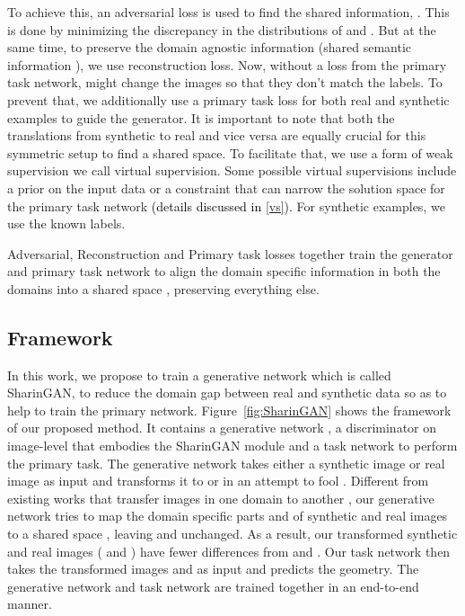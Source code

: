 \documentclass[10pt,twocolumn,letterpaper]{article}
\newcommand{\camready}[1]{\textcolor{black}{#1}}
\begin{document}
To achieve this, an adversarial loss is used to find the shared information, . This is done by minimizing the discrepancy in the distributions of  and . 
But at the same time, to preserve the domain agnostic information (shared semantic information ), we use reconstruction loss. 
Now, without a loss from the primary task network,  might change the images so that they don't match the labels. 
To prevent that, we additionally use a primary task loss for both real and synthetic examples to guide the generator. 
It is important to note that both the translations from synthetic to real and vice versa are equally crucial for this symmetric setup to find a shared space. 
To facilitate that, we use a form of weak supervision we call virtual supervision. Some possible virtual supervisions include a prior on the input data or a constraint that can narrow the solution space for the primary task network \camready{(details discussed in \ref{vs}).}
For synthetic examples, we use the known labels.

Adversarial, Reconstruction and Primary task losses together train the generator and primary task network to align the domain specific information  in both the domains into a shared space , preserving everything else.











\subsection{Framework}
In this work, we propose to train a generative network which is called SharinGAN, to reduce the domain gap between real and synthetic data so as to help to train the primary network.
Figure~\ref{fig:SharinGAN} shows the framework of our proposed method.
It contains a generative network , a discriminator on image-level  that embodies the SharinGAN module and a task network  to perform the primary task.
The generative network  takes either a synthetic image  or real image  as input and transforms it to  or  in an attempt to fool .
Different from existing works that transfer images in one domain to another \cite{Amir2018,T2NET,GASDA}, our generative network  tries to map the domain specific parts  and  of synthetic and real images to a shared space , leaving  and  unchanged.
As a result, our transformed synthetic and real images ( and ) have fewer differences from  and .
Our task network  then takes the transformed images  and  as input and predicts the geometry.
The generative network  and task network  are trained together in an end-to-end manner.
\end{document}

